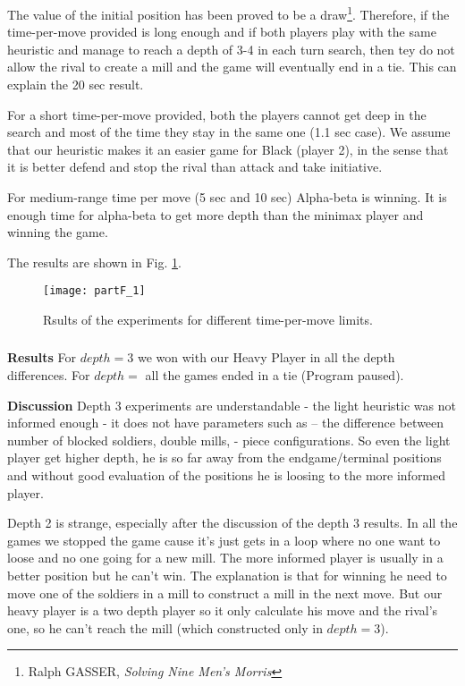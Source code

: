 \subsubsection{}
The value of the initial position has been proved to be a draw\footnote{Ralph GASSER, \textit{Solving Nine Men's Morris}}. Therefore, if the time-per-move provided is long enough and if both players play with the same heuristic and manage to reach a depth of 3-4 in each turn search, then tey do not allow the rival to create a mill and the game will eventually end in a tie. This can explain the 20 sec result.

For a short time-per-move provided, both the players cannot get deep in the search and most of the time they stay in the same one (1.1 sec case). We assume that our heuristic makes it an easier game for Black (player 2), in the sense that it is better defend and stop the rival than attack and take initiative.

For medium-range time per move (5 sec and 10 sec) Alpha-beta is winning. It is enough time for alpha-beta to get more depth than the minimax player and winning the game.

The results are shown in Fig. \ref{fig:partF_1}.
\begin{figure}[h]
    \centering
    \texttt{[image: partF\_1]}
    \caption{Rsults of the experiments for different time-per-move limits.}
    \label{fig:partF_1}
\end{figure}



\subsubsection{}
\textbf{Results}
For $depth=3$ we won with our Heavy Player in all the depth differences. For $depth=$ all the games ended in a tie (Program paused).

\textbf{Discussion}
Depth 3 experiments are understandable - the light heuristic was not informed enough - it does not have parameters such as – the difference between number of blocked soldiers, double mills, - piece configurations. So even the light player get higher depth, he is so far away from the endgame/terminal positions and without good evaluation of the positions he is loosing to the more informed player.

Depth 2 is strange, especially after the discussion of the depth 3 results. In all the games we stopped the game cause it’s just gets in a loop where no one want to loose and no one going for a new mill. The more informed player is usually in a better position but he can’t win. The explanation is that for winning he need to move one of the soldiers in a mill to construct a mill in the next move. But our heavy player is a two depth player so it only calculate his move and the rival’s one, so he can’t reach the mill (which constructed only in $depth=3$).

